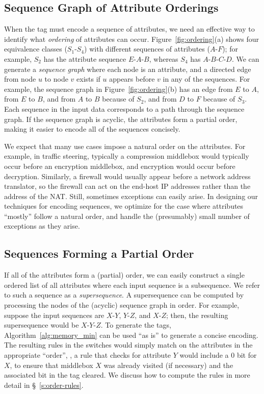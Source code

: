 \subsection{Sequence Graph of Attribute Orderings}
When the tag must encode a sequence of attributes, we need an effective way to identify what \emph{ordering} of attributes can occur.  Figure~\ref{fig:ordering}(a) shows four equivalence classes ($S_1$-$S_4$) with different sequences of attributes ($A$-$F$); for example, $S_2$ has the attribute sequence $E$-$A$-$B$, whereas $S_4$ has $A$-$B$-$C$-$D$.  We can generate a \emph{sequence graph} where each node is an attribute, and a directed edge from node $u$ to node $v$ exists if $u$ appears before $v$ in any of the sequences.  For example, the sequence graph in Figure~\ref{fig:ordering}(b) has an edge from $E$ to $A$, 
from $E$ to $B$, and from $A$ to $B$ because of $S_2$, and from $D$ to $F$ because of $S_3$.  Each sequence in the input data corresponds to a path through the sequence graph.  If the sequence graph is acyclic, the attributes form a partial order, making it easier to encode all of the sequences concisely.

We expect that many use cases impose a natural order on the attributes.  For example, in traffic steering, typically a compression middlebox would typically occur before an encryption middlebox, and encryption would occur before decryption.  Similarly, a firewall would usually appear before a network address translator, so the firewall can act on the end-host IP addresses rather than the address of the NAT.  Still, sometimes exceptions can easily arise.  In designing our techniques for encoding sequences, we optimize for the case where attributes ``mostly'' follow a natural order, and handle the (presumably) small number of exceptions as they arise.

\subsection{Sequences Forming a Partial Order}
If all of the attributes form a (partial) order, we can easily construct a single ordered list of all attributes where each input sequence is a subsequence. We refer to such a sequence as a \emph{supersequence}.  A supersequence can be computed by processing the nodes of the (acyclic) sequence graph in order. For example, suppose the input sequences are $X$-$Y$, $Y$-$Z$, and $X$-$Z$; then, the resulting supersequence would be $X$-$Y$-$Z$. To generate the tags, Algorithm~\ref{alg:memory_min} can be used ``as is'' to generate a concise encoding.  The resulting rules in the switches would simply match on the attributes in the appropriate ``order'', \eg, a rule that checks for attribute $Y$ would include a $0$ bit for $X$, to ensure that middlebox $X$ was already visited (if necessary) and the associated bit in the tag cleared.  We discuss how to compute the rules in more detail in \S~\ref{s:order-rules}.

